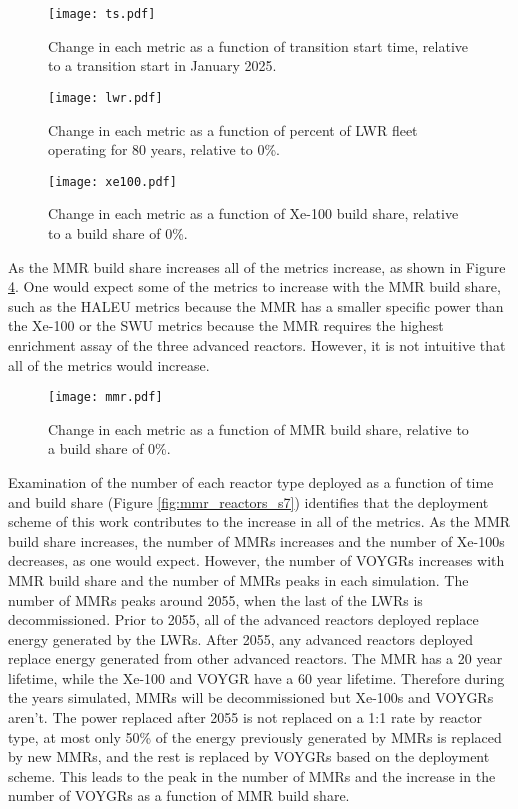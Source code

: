 \begin{figure}
    \centering
    \texttt{[image: ts.pdf]}
    \caption{Change in each metric as a function of transition start 
    time, relative to a transition start in January 2025.}
    \label{fig:ts_scenario7}
\end{figure}

\begin{figure}
    \centering
    \texttt{[image: lwr.pdf]}
    \caption{Change in each metric as a function of percent of LWR fleet  
    operating for 80 years, relative to 0\%.}
    \label{fig:lwr_scenario7}
\end{figure}
\begin{figure}
    \centering
    \texttt{[image: xe100.pdf]}
    \caption{Change in each metric as a function of Xe-100 build share, 
    relative to a build share of 0\%.}
    \label{fig:xe100_scenario7}
\end{figure}

As the \gls{MMR} build share increases all of the metrics increase, as shown 
in Figure \ref{fig:mmr_scenario7}. One would expect some of the metrics 
to increase with the \gls{MMR} build share, such as the \gls{HALEU} metrics 
because the \gls{MMR} has a smaller specific power than the Xe-100 or the 
\gls{SWU} metrics because the \gls{MMR} requires the highest enrichment 
assay of the three advanced reactors. However, it is not intuitive that 
all of the metrics would increase. 
\begin{figure}
    \centering
    \texttt{[image: mmr.pdf]}
    \caption{Change in each metric as a function of MMR build share, 
    relative to a build share of 0\%.}
    \label{fig:mmr_scenario7}
\end{figure}

Examination of the number of each reactor type deployed as a function 
of time and build share (Figure \ref{fig:mmr_reactors_s7}) identifies 
that the deployment scheme of this work contributes to the increase 
in all of the metrics. As the \gls{MMR} build share increases, the number of 
\glspl{MMR} increases and the number of Xe-100s decreases, as one would 
expect. However, the number of VOYGRs increases with \gls{MMR} build share 
and the number of \glspl{MMR} peaks in each simulation. The number of 
\glspl{MMR} peaks around 2055, when the last of the \glspl{LWR} is decommissioned.
Prior to 2055, all of the advanced reactors deployed replace energy generated 
by the \glspl{LWR}. After 2055, any advanced reactors deployed replace 
energy generated from other advanced reactors. The \gls{MMR} has a 20 year 
lifetime, while the Xe-100 and VOYGR have a 60 year lifetime. Therefore during 
the years simulated, \glspl{MMR} will be decommissioned but Xe-100s and VOYGRs 
aren't. The power replaced after 2055 is not replaced on a 1:1 rate by 
reactor type, at most only 50\% of the energy previously generated by 
\glspl{MMR} is replaced by new \glspl{MMR}, and the rest is replaced by VOYGRs 
based on the deployment scheme. This leads to the peak in the number of 
\glspl{MMR} and the increase in the number of VOYGRs as a function of 
\gls{MMR} build share. 

